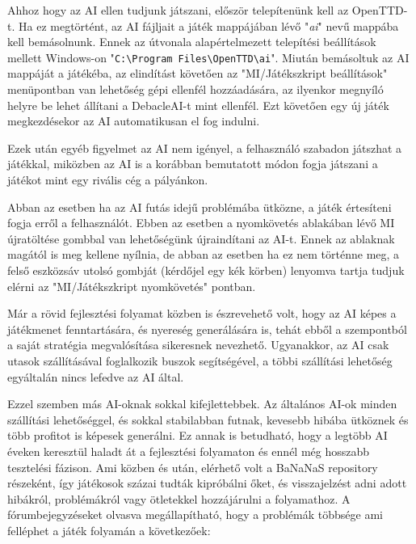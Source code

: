 
\label{sec:installation}

Ahhoz hogy az AI ellen tudjunk játszani, először telepítenünk kell az OpenTTD-t. Ha ez megtörtént, az AI fájljait a játék mappájában lévő "\textit{ai}" nevű mappába kell bemásolnunk. Ennek az útvonala alapértelmezett telepítési beállítások mellett Windows-on "\texttt{C:\textbackslash Program Files\textbackslash OpenTTD\textbackslash ai}". Miután bemásoltuk az AI mappáját a játékéba, az elindítást követően az "MI/Játékszkript beállítások" menüpontban van lehetőség gépi ellenfél hozzáadására, az ilyenkor megnyíló helyre be lehet állítani a DebacleAI-t mint ellenfél. Ezt követően egy új játék megkezdésekor az AI automatikusan el fog indulni.

Ezek után egyéb figyelmet az AI nem igényel, a felhasználó szabadon játszhat a játékkal, miközben az AI is a korábban bemutatott módon fogja játszani a játékot mint egy rivális cég a pályánkon.

Abban az esetben ha az AI futás idejű problémába ütközne, a játék értesíteni fogja erről a felhasználót. Ebben az esetben a nyomkövetés ablakában lévő MI újratöltése gombbal van lehetőségünk újraindítani az AI-t. Ennek az ablaknak magától is meg kellene nyílnia, de abban az esetben ha ez nem történne meg, a felső eszközsáv utolsó gombját (kérdőjel egy kék körben) lenyomva tartja tudjuk elérni az "MI/Játékszkript nyomkövetés" pontban.


Már a rövid fejlesztési folyamat közben is észrevehető volt, hogy az AI képes a játékmenet fenntartására, és nyereség generálására is, tehát ebből a szempontból a saját stratégia megvalósítása sikeresnek nevezhető. Ugyanakkor, az AI csak utasok szállításával foglalkozik buszok segítségével, a többi szállítási lehetőség egyáltalán nincs lefedve az AI által.

Ezzel szemben más AI-oknak sokkal kifejlettebbek. Az általános AI-ok minden szállítási lehetőséggel, és sokkal stabilabban futnak, kevesebb hibába ütköznek és több profitot is képesek generálni. Ez annak is betudható, hogy a legtöbb AI éveken keresztül haladt át a fejlesztési folyamaton és ennél még hosszabb tesztelési fázison. Ami közben és után, elérhető volt a BaNaNaS repository részeként, így játékosok százai tudták kipróbálni őket, és visszajelzést adni adott hibákról, problémákról vagy ötletekkel hozzájárulni a folyamathoz. A fórumbejegyzéseket olvasva megállapítható, hogy a problémák többsége ami felléphet a játék folyamán a következőek: 

